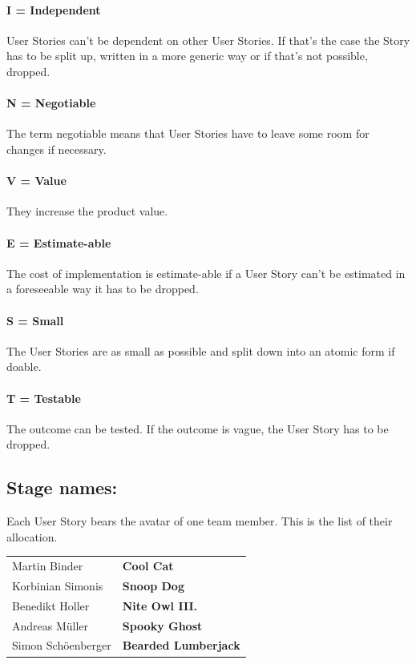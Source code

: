 \documentclass{scrreprt}
\begin{document}
\paragraph{I = Independent} User Stories can't be dependent on other User Stories. If that's the case the Story has to be split up, written in a more generic way or if that's not possible, dropped.
\paragraph{N = Negotiable} The term negotiable means that User Stories have to leave some room for changes if necessary.
\paragraph{V = Value} They increase the product value. 
\paragraph{E = Estimate-able} The cost of implementation is estimate-able if a User Story can't be estimated in a foreseeable way it has to be dropped.
\paragraph{S = Small} The User Stories are as small as possible and split down into an atomic form if doable.
\paragraph{T = Testable} The outcome can be tested. If the outcome is vague, the User Story has to be dropped.  \\
\subsection{Stage names:}
Each User Story bears the avatar of one team member. This is the list of their allocation. \\ 
\begin{tabularx}{8cm}{l|l}
	Martin Binder & \textbf{Cool Cat} \\
	Korbinian Simonis & \textbf{Snoop Dog} \\
	Benedikt Holler & \textbf{Nite Owl III.} \\
	 Andreas M\"uller & \textbf{Spooky Ghost} \\
	 Simon Sch\"oenberger & \textbf{Bearded Lumberjack} 
\end{tabularx}
\end{document}
